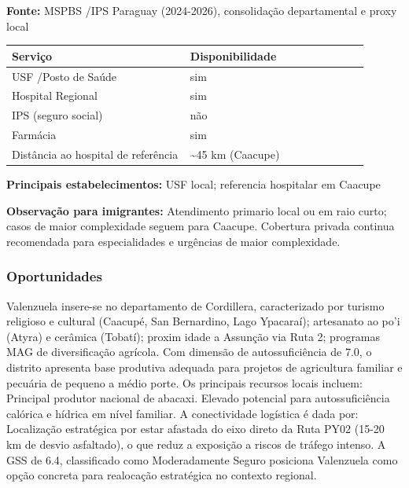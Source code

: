 \textbf{Fonte:} MSPBS /\allowbreak  IPS Paraguay (2024-2026), consolidação
departamental e proxy local

{\def\LTcaptype{none} %
\begin{longtable}{@{}>{\raggedright\arraybackslash}p{0.45\linewidth} >{\raggedright\arraybackslash}p{0.45\linewidth}@{}}
\toprule\noalign{}
Serviço & Disponibilidade \\
\midrule\noalign{}
\endhead
\bottomrule\noalign{}
\endlastfoot
USF /\allowbreak  Posto de Saúde & sim \\
Hospital Regional & sim \\
IPS (seguro social) & não \\
Farmácia & sim \\
Distância ao hospital de referência & \textasciitilde45 km (Caacupe) \\
\end{longtable}
}

\textbf{Principais estabelecimentos:} USF local; referencia hospitalar
em Caacupe

\textbf{Observação para imigrantes:} Atendimento primario local ou em
raio curto; casos de maior complexidade seguem para Caacupe. Cobertura
privada continua recomendada para especialidades e urgências de maior
complexidade.

\subsubsection*{Oportunidades}\label{oport-valenzuela-0319}
Valenzuela insere-se no departamento de Cordillera, caracterizado por turismo religioso e cultural (Caacupé, San Bernardino, Lago Ypacaraí); artesanato ao po'i (Atyra) e cerâmica (Tobatí); proxim idade a Assunção via Ruta 2; programas MAG de diversificação agrícola. Com dimensão de autossuficiência de 7.0, o distrito apresenta base produtiva adequada para projetos de agricultura familiar e pecuária de pequeno a médio porte. Os principais recursos locais incluem: Principal produtor nacional de abacaxi. Elevado potencial para autossuficiência calórica e hídrica em nível familiar. A conectividade logística é dada por: Localização estratégica por estar afastada do eixo direto da Ruta PY02 (15-20 km de desvio asfaltado), o que reduz a exposição a riscos de tráfego intenso. A GSS de 6.4, classificado como Moderadamente Seguro posiciona Valenzuela como opção concreta para realocação estratégica no contexto regional.


